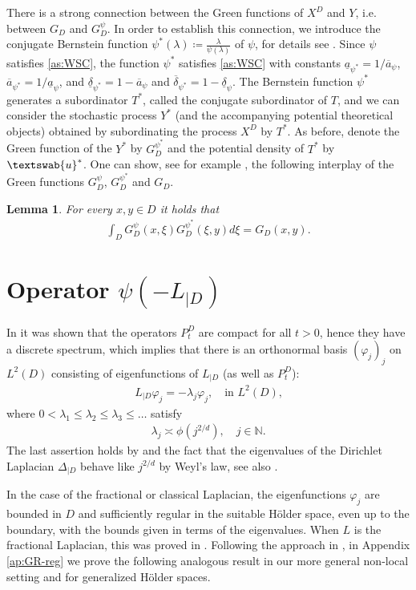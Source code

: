 \documentclass[12pt,a4paper,onecolumn]{article}
\newtheorem{lem}[thm]{Lemma}
\theoremstyle{definition}
\newcommand{\N}{\mathbb{N}}
\newcommand{\1}{\mathbf 1}
\newcommand{\ua}[1]{\underline{a}_{#1}}
\newcommand{\oa}[1]{\overline{a}_{#1}}
\newcommand{\ud}[1]{\underline{\delta}_{#1}}
\newcommand{\od}[1]{\overline{\delta}_{#1}}
\newcommand{\Lbase}{L_{|D}}
\newcommand{\Lo}{\psi(-L_{|D})}
\newcommand{\GDP}{G_D^\psi}
\newcommand{\GDPs}{G_D^{\psi^*}}
\newcommand{\uu}{\textswab{u}}
\numberwithin{equation}{section}
\begin{document}
    There is a strong connection between the Green functions of $X^D$ and $Y$, i.e. between $G_D$ and $\GDP$. In order to establish this connection, we introduce the conjugate Bernstein function $\psi^*(\lambda)\coloneqq\frac{\lambda}{\psi(\lambda)}$ of $\psi$, for details see \cite{bernstein}. Since $\psi$ satisfies \ref{as:WSC}, the function $\psi^*$ satisfies
	\ref{as:WSC} with constants $\ua{\psi^*}=1/\oa{\psi}$, $\oa{\psi^*}=1/\ua{\psi}$, and $\ud{\psi^*}=1-\oa{\psi}$ and $\od{\psi^*}=1-\ud\psi$. The Bernstein function $\psi^*$ generates a subordinator $T^*$, called the conjugate subordinator of $T$, and we can consider the stochastic process $Y^*$ (and the accompanying potential theoretical objects) obtained by subordinating the process $X^D$ by $T^*$. As before, denote the Green function of the $Y^*$ by $\GDPs$ and the potential density of $T^*$ by $\uu^*$. One can show, see for example \cite[Proposition 14.2.(ii)]{bernstein}, the following interplay of the Green functions $\GDP$, $\GDPs$ and $G_D$.
	\begin{lem}\label{l:compos-of-GDs}
		For every $x,y\in D$ it holds that
		\begin{align*}
			\int_D \GDP(x,\xi)\GDPs(\xi,y)d\xi=G_D(x,y).
		\end{align*}
	\end{lem}
	
	
	\section{Operator $\Lo$}\label{s:operator}
	
	In \cite[Theorem 2.1]{ChenSong-Spectral07} it was shown that the operators $P^D_t$ are compact for all $t>0$, hence they have a discrete spectrum, which implies that there is an orthonormal basis $(\varphi_j)_j$ on $L^2(D)$ consisting of
	eigenfunctions of $\Lbase$ (as well as $P^D_t$):
	\begin{align}\label{1028}
		\Lbase \varphi_j=-\lambda_j\varphi_j,\quad \text{in $L^2(D)$,}
	\end{align}
	where $0<\lambda_1\le \lambda_2\le\lambda_3\le\dots$ satisfy
	\begin{align*}
		\lambda_j\asymp \phi(j^{2/d}),\quad j\in \N.
	\end{align*}
	The last assertion holds by \cite[Theorem 4.5]{ChenSong-Two-sided-JFA05} and the fact that the eigenvalues of the Dirichlet Laplacian $\Delta_{|D}$ behave like $j^{2/d}$ by Weyl's law, see also \cite[Theorem 2.7]{chung_zhao}.
	
	In the case of the fractional or classical Laplacian, the eigenfunctions $\varphi_j$ are bounded in $D$ and sufficiently regular in the suitable H\"older space, even up to the boundary, with the bounds given in terms of the eigenvalues. When $L$ is the fractional Laplacian, this was proved in \cite{Fernandez-RealRos-Oton2014}. Following the approach in \cite{Fernandez-RealRos-Oton2014}, in Appendix \ref{ap:GR-reg} we prove the following analogous result in our more general non-local setting and for generalized H\"older spaces.
	 	 
\end{document}
